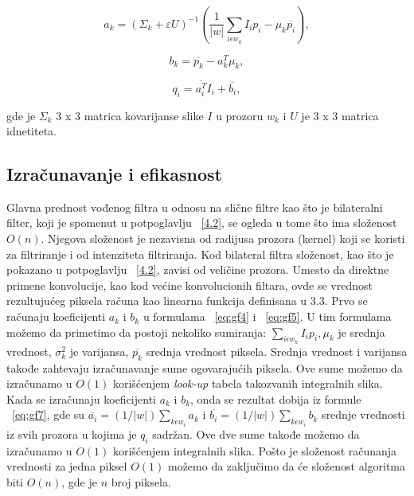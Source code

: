 \documentclass[a4paper,12pt,titlepage]{article}
\begin{document}
\begin{equation}\label{eq:gf11}
	a_k = (\Sigma_k + \varepsilon U)^{-1} (\dfrac{1}{|w|} \sum_{i \epsilon w_k} I_i p_i - \mu_k \overline{p_i}),
\end{equation}

\begin{equation}\label{eq:gf12}
	b_k = \overline{p_k} - a_k^T \mu_k,
\end{equation}

\begin{equation}\label{eq:gf13}
	q_i = \overline{a_i^T} I_i + \overline{b_i},
\end{equation}

gde je $\Sigma_k$ 3 x 3 matrica kovarijanse slike $I$ u prozoru $w_k$ i $U$ je 3 x 3 matrica idnetiteta.

\subsection{Izračunavanje i efikasnost}%

Glavna prednost vođenog filtra u odnosu na slične filtre kao što je bilateralni filter, koji je spomenut u potpoglavlju ~\ref{4.2}, se ogleda u tome što ima složenost $O(n)$. Njegova složenost je nezavisna od radijusa prozora (kernel) koji se koristi za filtriranje i od intenziteta filtriranja. Kod bilateral filtra složenost, kao što je pokazano u potpoglavlju ~\ref{4.2}, zavisi od veličine prozora. Umesto da direktne primene konvolucije, kao kod većine konvolucionih filtara, ovde se vrednost rezultujućeg piksela računa kao linearna funkcija definisana u 3.3. Prvo se računaju koeficijenti $a_k$ i $b_k$ u formulama ~\ref{eq:gf4} i ~\ref{eq:gf5}. U tim formulama možemo da primetimo da postoji nekoliko sumiranja:  $\sum_{i \epsilon w_k} I_ip_i, \mu_k$ je srednja vrednost, $\sigma_k^2$ je varijansa, $\overline{p_k}$ srednja vrednost piksela. Srednja vrednost i varijansa takođe zahtevaju izračunavanje sume ogovarajućih piksela. Ove sume možemo da izračunamo u $O(1)$ korišćenjem \emph{look-up} tabela takozvanih integralnih slika. Kada se izračunaju koeficijenti $a_k$ i $b_k$, onda se rezultat dobija iz formule ~\ref{eq:gf7}, 
gde su $\overline{a_i} = (1 / |w|) \sum_{k \epsilon w_i} a_k$ i $\overline{b_i} = (1 / |w|) \sum_{k \epsilon w_i} b_k$ srednje vrednosti iz svih prozora u kojima je $q_i$ sadržan. Ove dve sume takođe možemo da izračunamo u $O(1)$ korišćenjem  integralnih slika. Pošto je složenost računanja vrednosti za jedna piksel $O(1)$ možemo da zaključimo da  će složenost algoritma biti $O(n)$, gde je $n$ broj piksela.
\end{document}
